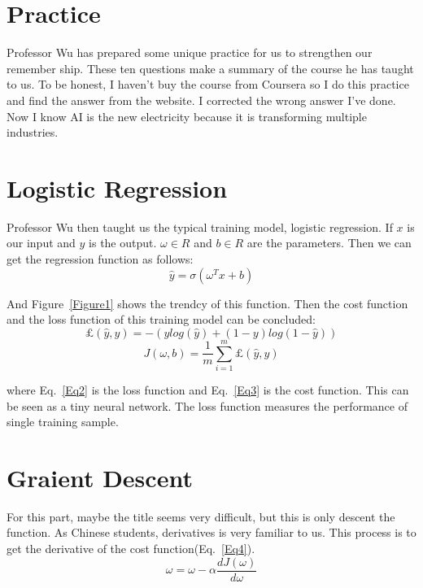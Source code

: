 \documentclass[a4paper]{article}
\begin{document}
\section{Practice}
Professor Wu has prepared some unique practice for us to strengthen our remember ship. These ten questions make a summary of the course he has taught to us. To be honest, I haven't buy the course from Coursera so I do this practice and find the answer from the website. I corrected the wrong answer I've done. Now I know AI is the new electricity because it is transforming multiple industries. 
\section{Logistic Regression}
Professor Wu then taught us the typical training model, logistic regression. If $x$ is our input and $y$ is the output. $\omega\in{R}$ and $b\in{R}$ are the parameters. Then we can get the regression function as follows:
\begin{equation}\label{Eq1}
\hat{y}=\sigma(\omega^T{x}+b)
\end{equation}
\par And Figure~\ref{Figure1} shows the trendcy of this function. Then the cost function and the loss function of this training model can be concluded:
 \begin{equation}\label{Eq2}
 \pounds(\hat{y},y)=-(ylog(\hat{y})+(1-y)log(1-\hat{y}))
 \end{equation}
 \begin{equation}\label{Eq3}
 J(\omega,b)=\frac{1}{m}\sum_{i=1}^{m}\pounds(\hat{y},y)
 \end{equation}
 \par where Eq.~\ref{Eq2} is the loss function and Eq.~\ref{Eq3} is the cost function. This can be seen as a tiny neural network. The loss function measures the performance of single training sample. 
\section{Graient Descent}
For this part, maybe the title seems very difficult, but this is only descent the function. As Chinese students, derivatives is very familiar to us. This process is to get the derivative of the cost function(Eq.~\ref{Eq4}). 
\begin{equation}\label{Eq4}
\omega=\omega-\alpha\frac{dJ(\omega)}{d\omega}
\end{equation}
\end{document}
